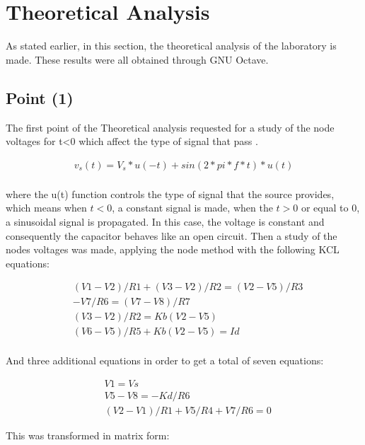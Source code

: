 \section{Theoretical Analysis}
\label{sec:analysis}

\par As stated earlier, in this section, the theoretical analysis of the laboratory is made. These results were all obtained through GNU Octave.



\subsection{Point (1)} 

\par The first point of the Theoretical analysis requested for a study of the node voltages for t<0 which affect the type of signal that pass . 

\begin{align*}  
v_s(t)=V_s*u(-t)+sin(2*pi*f*t)*u(t)\\   
\end{align*} 

where the u(t) function controls the type of signal that the source provides, which means when $t<0$, a constant signal is made, when the $t>0$ or equal to 0, a sinusoidal signal is propagated.  
In this case, the voltage is constant and consequently the capacitor behaves like an open circuit. Then a study of the nodes voltages was made, applying the node method with the following KCL equations: 

\begin{align*} 
&(V1-V2)/R1+(V3-V2)/R2 = (V2-V5)/R3 \\ 
&-V7/R6 = (V7-V8)/R7\\
&(V3-V2)/R2 = Kb(V2-V5) \\
&(V6-V5)/R5+Kb(V2-V5) = Id \\
\end{align*} 

And three additional equations in order to get a total of seven equations: 

\begin{align*} 
&V1=Vs \\ 
&V5-V8=-Kd/R6\\ 
&(V2-V1)/R1+V5/R4+V7/R6=0
\end{align*} 

This was transformed in matrix form:

